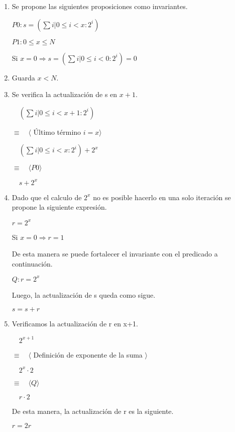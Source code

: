 \documentclass[hidelinks]{article}
\begin{document}
\begin{enumerate}
	\item Se propone las siguientes proposiciones como invariantes.\par
	      \begin{center}
		      $P0: s = (\sum i| 0\leq i < x :2^i)$ \par
		      $P1: 0 \leq x \leq N$ \par
	      \end{center}
	      Si $x = 0 \Rightarrow s = (\sum i| 0\leq i < 0 :2^i) = 0$ \par
	\item Guarda $x < N$.
	\item Se verifica la actualización de s en $x+1$. \par
	      $\quad (\sum i| 0\leq i < x+1 :2^i)$ \par
	      $\equiv \quad \langle$ Último término $ i = x \rangle$ \par
	      $\quad (\sum i| 0\leq i < x :2^i) + 2^x$ \par
	      $\equiv \quad \langle P0 \rangle$ \par
	      $\quad s + 2^x$ \par
	\item Dado que el calculo de $2^x$ no es posible hacerlo en una solo iteración se
	      propone la siguiente expresión. \par
	      $ r = 2^x$ \par
	      Si $x = 0 \Rightarrow r = 1$ \par
	      De esta manera se puede fortalecer el invariante con el predicado a
	      continuación.\par
	      \begin{center}
		      $ Q: r = 2^x$ \par
	      \end{center}
	      Luego, la actualización de s queda como sigue.\par
	      \begin{center}
		      $s = s + r$ \par
	      \end{center}
	\item Verificamos la actualización de r en x+1. \par
	      $\quad 2^{x+1}$ \par
	      $\equiv \quad \langle$ Definición de exponente de la suma $ \rangle$ \par
	      $\quad 2^{x} \cdot 2$ \par
	      $\equiv \quad \langle Q \rangle$ \par
	      $\quad r \cdot 2$ \par

	      De esta manera, la actualización de r es la siguiente. \par

	      \begin{center}
		      $r = 2r$ \par
	      \end{center}

\end{enumerate}
\end{document}
